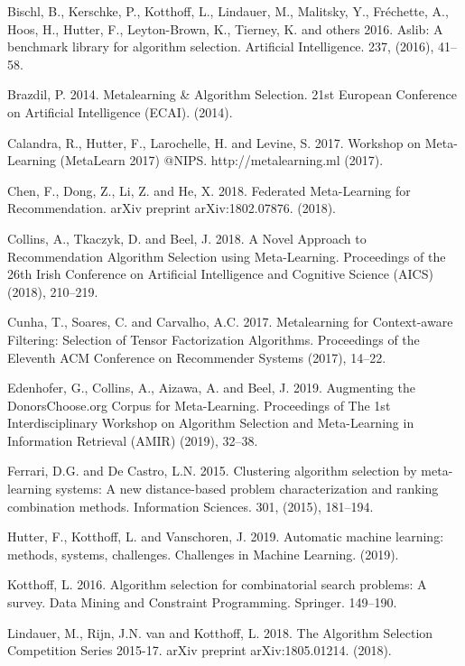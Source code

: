 \documentclass{article}
\begin{document}
\begin{thebibliography}{9}
Bischl, B., Kerschke, P., Kotthoff, L., Lindauer, M., Malitsky, Y., Fréchette, A., Hoos, H., Hutter, F., Leyton-Brown, K., Tierney, K. and others 2016. Aslib: A benchmark library for algorithm selection. Artificial Intelligence. 237, (2016), 41–58.

Brazdil, P. 2014. Metalearning \& Algorithm Selection. 21st European Conference on Artificial Intelligence (ECAI). (2014).

Calandra, R., Hutter, F., Larochelle, H. and Levine, S. 2017. Workshop on Meta-Learning (MetaLearn 2017) @NIPS. http://metalearning.ml (2017).

Chen, F., Dong, Z., Li, Z. and He, X. 2018. Federated Meta-Learning for Recommendation. arXiv preprint arXiv:1802.07876. (2018).

Collins, A., Tkaczyk, D. and Beel, J. 2018. A Novel Approach to Recommendation Algorithm Selection using Meta-Learning. Proceedings of the 26th Irish Conference on Artificial Intelligence and Cognitive Science (AICS) (2018), 210–219.

Cunha, T., Soares, C. and Carvalho, A.C. 2017. Metalearning for Context-aware Filtering: Selection of Tensor Factorization Algorithms. Proceedings of the Eleventh ACM Conference on Recommender Systems (2017), 14–22.

Edenhofer, G., Collins, A., Aizawa, A. and Beel, J. 2019. Augmenting the DonorsChoose.org Corpus for Meta-Learning. Proceedings of The 1st Interdisciplinary Workshop on Algorithm Selection and Meta-Learning in Information Retrieval (AMIR) (2019), 32–38.

Ferrari, D.G. and De Castro, L.N. 2015. Clustering algorithm selection by meta-learning systems: A new distance-based problem characterization and ranking combination methods. Information Sciences. 301, (2015), 181–194.

Hutter, F., Kotthoff, L. and Vanschoren, J. 2019. Automatic machine learning: methods, systems, challenges. Challenges in Machine Learning. (2019).

Kotthoff, L. 2016. Algorithm selection for combinatorial search problems: A survey. Data Mining and Constraint Programming. Springer. 149–190.

Lindauer, M., Rijn, J.N. van and Kotthoff, L. 2018. The Algorithm Selection Competition Series 2015-17. arXiv preprint arXiv:1805.01214. (2018).


\end{thebibliography}
\end{document}
